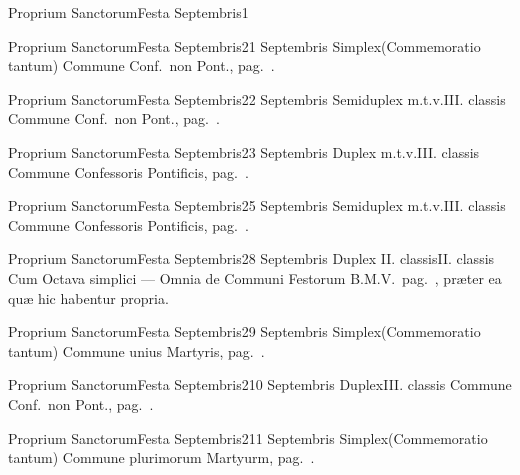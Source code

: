 \documentclass[nocturnale-romanum.tex]{subfiles}
\begin{document}
	{Proprium Sanctorum}{Festa Septembris}{1}{}
	{}{}{}{}

	{Proprium Sanctorum}{Festa Septembris}{2}{1 Septembris}
	{Simplex}{(Commemoratio tantum)}
	{Commune Conf.\ non Pont., pag.\ \pageref{M-CONP}.}
	{}

	{Proprium Sanctorum}{Festa Septembris}{2}{2 Septembris}
	{Semiduplex m.t.v.}{III. classis}
	{Commune Conf.\ non Pont., pag.\ \pageref{M-CONP}.}
	{}

	{Proprium Sanctorum}{Festa Septembris}{2}{3 Septembris}
	{Duplex m.t.v.}{III. classis}
	{Commune Confessoris Pontificis, pag.\ \pageref{M-COPO}.}
	{}

	{Proprium Sanctorum}{Festa Septembris}{2}{5 Septembris}
	{Semiduplex m.t.v.}{III. classis}
	{Commune Confessoris Pontificis, pag.\ \pageref{M-COPO}.}
	{}

	{Proprium Sanctorum}{Festa Septembris}{2}{8 Septembris}
	{Duplex II. classis}{II. classis}
	{Cum Octava simplici --- Omnia de Communi Festorum B.M.V.\ pag.\ \pageref{M-CBMV}, præter ea quæ hic habentur propria.}
	{}
\tedeumrubric

	{Proprium Sanctorum}{Festa Septembris}{2}{9 Septembris}
	{Simplex}{(Commemoratio tantum)}
	{Commune unius Martyris, pag.\ \pageref{M-UMEX}.}
	{}

	{Proprium Sanctorum}{Festa Septembris}{2}{10 Septembris}
	{Duplex}{III. classis}
	{Commune Conf.\ non Pont., pag.\ \pageref{M-CONP}.}
	{}

	{Proprium Sanctorum}{Festa Septembris}{2}{11 Septembris}
	{Simplex}{(Commemoratio tantum)}
	{Commune plurimorum Martyurm, pag.\ \pageref{M-PMEX}.}
	{}
\end{document}
